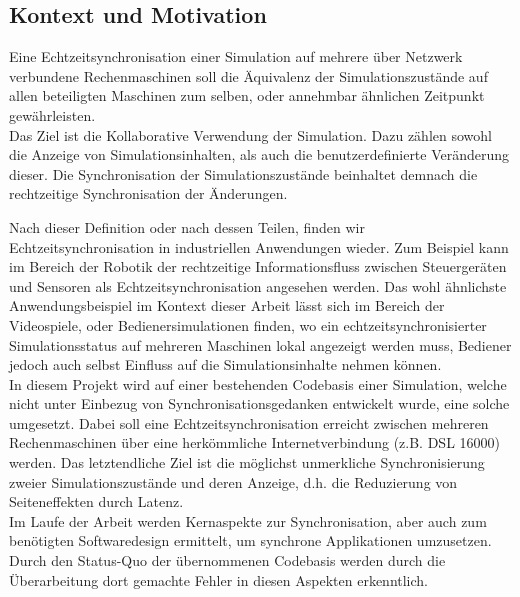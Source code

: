 

\subsection{Kontext und Motivation}
Eine Echtzeitsynchronisation einer Simulation auf mehrere über Netzwerk verbundene Rechenmaschinen soll die Äquivalenz der Simulationszustände auf allen beteiligten Maschinen zum selben, oder annehmbar ähnlichen Zeitpunkt gewährleisten.\\
Das Ziel ist die Kollaborative Verwendung der Simulation. 
Dazu zählen sowohl die Anzeige von Simulationsinhalten, als auch
die benutzerdefinierte Veränderung dieser. 
Die Synchronisation der Simulationszustände beinhaltet demnach die rechtzeitige Synchronisation der Änderungen.

Nach dieser Definition oder nach dessen Teilen, finden wir Echtzeitsynchronisation in industriellen Anwendungen wieder. Zum Beispiel kann im Bereich der Robotik der rechtzeitige Informationsfluss zwischen Steuergeräten und Sensoren als Echtzeitsynchronisation angesehen werden.
Das wohl ähnlichste Anwendungsbeispiel im Kontext dieser Arbeit lässt sich im Bereich der Videospiele, oder Bedienersimulationen finden, wo ein echtzeitsynchronisierter Simulationsstatus auf mehreren Maschinen lokal angezeigt werden muss, Bediener jedoch auch selbst Einfluss auf die Simulationsinhalte nehmen können.\\
In diesem Projekt wird auf einer bestehenden Codebasis einer Simulation, welche nicht unter Einbezug von Synchronisationsgedanken entwickelt wurde, eine solche umgesetzt. Dabei soll eine Echtzeitsynchronisation erreicht zwischen mehreren Rechenmaschinen über eine herkömmliche Internetverbindung (z.B. DSL 16000) werden.
Das letztendliche Ziel ist die möglichst unmerkliche Synchronisierung zweier Simulationszustände und deren Anzeige, d.h. die Reduzierung von Seiteneffekten durch Latenz.\\
Im Laufe der Arbeit werden Kernaspekte zur Synchronisation, aber auch zum benötigten Softwaredesign ermittelt, um synchrone Applikationen umzusetzen. Durch den Status-Quo der übernommenen Codebasis werden durch die Überarbeitung dort gemachte Fehler in diesen Aspekten erkenntlich.

